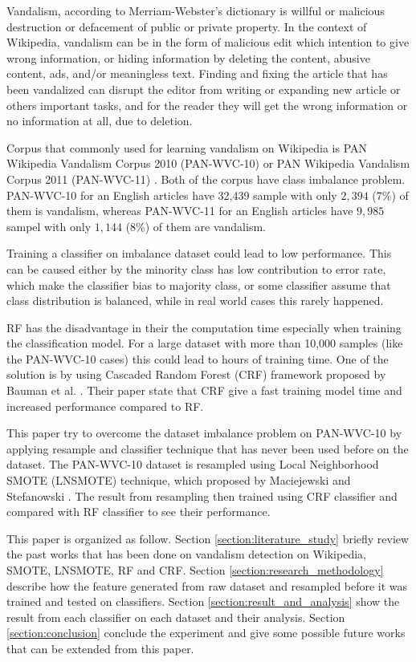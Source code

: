 \documentclass[conference,compsoc,a4paper,twocolumn,final]{IEEEtran}
\begin{document}
Vandalism, according to Merriam-Webster's dictionary is willful or malicious
destruction or defacement of public or private property.
In the context of Wikipedia, vandalism can be in the form of malicious edit
which intention to give wrong information, or hiding information by deleting
the content, abusive content, ads, and/or meaningless text.
Finding and fixing the article that has been vandalized can disrupt the editor
from writing or expanding new article or others important tasks, and for the
reader they will get the wrong information or no information at all, due to
deletion.

Corpus that commonly used for learning vandalism on Wikipedia is PAN Wikipedia
Vandalism Corpus 2010 (PAN-WVC-10)
\cite{potthast:2010b}
or PAN Wikipedia Vandalism Corpus 2011 (PAN-WVC-11)
\cite{potthast:2010b}.
Both of the corpus have class imbalance problem.
PAN-WVC-10 for an English articles have 32,439 sample with only $2,394$ (7\%)
of them is vandalism, whereas PAN-WVC-11 for an English articles have $9,985$
sampel with only $1,144$ (8\%) of them are vandalism.

Training a classifier on imbalance dataset could lead to low performance.
This can be caused either by the minority class has low contribution to error
rate, which make the classifier bias to majority class, or some classifier
assume that class distribution is balanced, while in real world cases this
rarely happened.

RF has the disadvantage in their the computation time especially when training
the classification model.
For a large dataset with more than 10,000 samples (like the PAN-WVC-10 cases)
this could lead to hours of training time.
One of the solution is by using Cascaded Random Forest (CRF) framework proposed
by Bauman et al.
\cite{baumann2013cascaded}.
Their paper state that CRF give a fast training model time and increased
performance compared to RF.

This paper try to overcome the dataset imbalance problem on PAN-WVC-10 by
applying resample and classifier technique that has never been used before on
the dataset.
The PAN-WVC-10 dataset is resampled using Local Neighborhood SMOTE (LNSMOTE)
technique,
which proposed by Maciejewski and Stefanowski
\cite{maciejewski2011local}.
The result from resampling then trained using CRF classifier and compared with
RF classifier to see their performance.

This paper is organized as follow.
Section \ref{section:literature_study} briefly review the past works that has
been done on vandalism detection on Wikipedia, SMOTE, LNSMOTE, RF and CRF.
Section \ref{section:research_methodology} describe how the feature generated
from raw dataset and resampled before it was trained and tested on classifiers.
Section \ref{section:result_and_analysis} show the result from each classifier
on each dataset and their analysis.
Section \ref{section:conclusion} conclude the experiment and
give some possible future works that can be extended from this paper.
\end{document}
